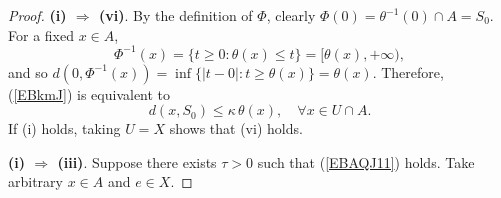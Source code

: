 \documentclass[11pt]{article}
\begin{document}
\begin{proof}
	
	\noindent\textbf{(i) $\Rightarrow$ (vi)}.
	By the definition of $\Phi$, clearly $\Phi(0)=\theta^{-1}(0)\cap A= S_0$.
	For a fixed $x\in A$,
	\[
	\Phi^{-1}(x)=\{t\ge0:\theta(x)\le t\}=[\theta(x),+\infty),
	\]
	and	so $d(0,\Phi^{-1}(x))=\inf\{|t-0|:t\ge\theta(x)\}=\theta(x)$.
	Therefore,      (\ref{EBkmJ})    is equivalent to
	\begin{equation}\label{EViiiD}
		d(x, S_0)\le\kappa\,\theta(x),\quad\forall x\in U\cap A.
	\end{equation}
	If (i) holds, taking $U=X$ shows that (vi) holds.
	
	
	
	
	
	
	
	
	
	
	\noindent\textbf{(i) $\Rightarrow$ (iii)}.
	Suppose there exists \(\tau > 0\)  such that   (\ref{EBAQJ11}) holds. Take arbitrary \(x \in A\) and \(e \in X\).
	

\end{proof}
\end{document}
